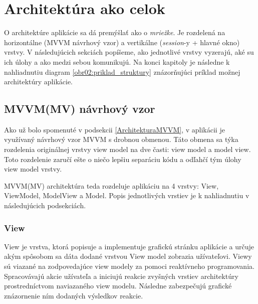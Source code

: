 \chapter{Architektúra ako celok}

O architektúre aplikácie sa dá premýšlať ako o \textit{mriežke}. Je rozdelená na horizontálne (MVVM návrhový vzor) a vertikálne (\textit{session}-y + hlavné okno) vrstvy. V následujúcich sekciách popíšeme, ako jednotlivé vrstvy vyzerajú, aké su ich úlohy a ako medzi sebou komunikujú. Na konci kapitoly je následne k nahliadnutiu diagram \ref{obr02:priklad_struktury} znázorňujúci príklad možnej architektúry aplikácie.   

\section{MVVM(MV) návrhový vzor}\label{MVVMNavrhovyVzor}

Ako už bolo spomenuté v podsekcii \ref{ArchitekturaMVVM}, v aplikácii je využívaný návrhový vzor MVVM s drobnou obmenou. Táto obmena sa týka rozdelenia originálnej vrstvy view model na dve časti: view model a model view. Toto rozdelenie zaručí ešte o niečo lepšiu separáciu kódu a odľahčí tým úlohy view model vrstvy. 

MVVM(MV) architektúra teda rozdeluje aplikáciu na 4 vrstvy: View, ViewModel, ModelView a Model. Popis jednotlivých vrstiev je k nahliadnutiu v následujúcich podsekciách. 

\subsection{View}

View je vrstva, ktorá popisuje a implementuje grafickú stránku aplikácie a určuje akým spôsobom sa dáta dodané vrstvou View model zobrazia užívateľovi. Viewy sú viazané na zodpovedajúce view modely za pomoci reaktívneho programovania. Spracovávajú akcie užívateľa a iniciujú reakcie zvyšných vrstiev architektúry prostredníctvom naviazaného view modelu. Následne zabezpečujú grafické znázornenie ním dodaných výsledkov reakcie.

